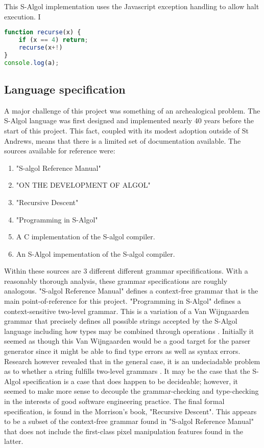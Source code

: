 \documentclass{article}
\begin{document}
This S-Algol implementation uses the Javascript exception handling to allow halt execution. I

\begin{lstlisting}[caption={S-Algol-like Javascript scoping},label={lst:betterscope}, language=javascript, escapechar="|"]
function recurse(x) {
	if (x == 4) return;
	recurse(x+!)
}
console.log(a);
\end{lstlisting}


\subsection{Language specification}

A major challenge of this project was something of an archealogical problem. The S-Algol language was first designed and implemented nearly 40 years before the start of this project. This fact, coupled with its modest adoption outside of St Andrews, means that there is a limited set of documentation available. The sources available for reference were:

\begin{enumerate}
\item "S-algol Reference Manual" \cite{TODO}
\item "ON THE DEVELOPMENT OF ALGOL" \cite{TODO}
\item "Recursive Descent" \cite{TODO}
\item "Programming in S-Algol" \cite{TODO}
\item A C implementation of the S-algol compiler. 
\item An S-Algol impementation of the S-algol compiler. 
\end{enumerate}

Within these sources are 3 different different grammar specififications. With a reasonably thorough analysis, these grammar specifications are roughly analogous. "S-algol Reference Manual" defines a context-free grammar that is the main point-of-reference for this project. "Programming in S-Algol" defines a context-sensitive two-level grammar. This is a variation of a Van Wijngaarden grammar that precisely defines all possible strings accepted by the S-Algol language including how types may be combined through operations \cite{TODO}. Initially it seemed as though this Van Wijngaarden would be a good target for the parser generator since it might be able to find type errors as well as syntax errors. Research however revealed that in the general case, it is an undeciadable problem as to whether a string fulfills two-level grammars \cite{TODO}. It may be the case that the S-Algol specification is a case that does happen to be decideable; however, it seemed to make more sense to decouple the grammar-checking and type-checking in the interests of good software engineering practice. The final formal specification, is found in the Morrison's book, "Recursive Descent". This appears to be a subset of the context-free grammar found in "S-algol Reference Manual" that does not include the first-class pixel manipulation features found in the latter.
\end{document}
